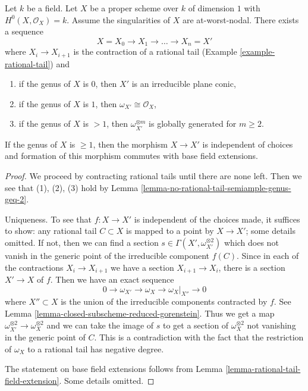 \begin{lemma}
\label{lemma-contracting-rational-tails}
Let $k$ be a field. Let $X$ be a proper scheme over $k$ of dimension $1$
with $H^0(X, \mathcal{O}_X) = k$. Assume the singularities of $X$ are
at-worst-nodal. There exists a sequence
$$
X = X_0 \to X_1 \to \ldots \to X_n = X'
$$
where $X_i \to X_{i + 1}$ is the contraction of a rational tail
(Example \ref{example-rational-tail}) and
\begin{enumerate}
\item if the genus of $X$ is $0$, then $X'$ is an irreducible
plane conic,
\item if the genus of $X$ is $1$, then $\omega_{X'} \cong \mathcal{O}_X$,
\item if the genus of $X$ is $> 1$, then
$\omega_{X'}^{\otimes m}$ is globally generated for $m \geq 2$.
\end{enumerate}
If the genus of $X$ is $\geq 1$, then the morphism $X \to X'$
is independent of choices and formation of this morphism
commutes with base field extensions.
\end{lemma}

\begin{proof}
We proceed by contracting rational tails until there are none
left. Then we see that (1), (2), (3) hold by
Lemma \ref{lemma-no-rational-tail-semiample-genus-geq-2}.

\medskip\noindent
Uniqueness. To see that $f : X \to X'$ is independent of the choices
made, it suffices to show: any rational tail $C \subset X$ is
mapped to a point by $X \to X'$; some details omitted.
If not, then we can find a section
$s \in \Gamma(X', \omega_{X'}^{\otimes 2})$ which does
not vanish in the generic point of the irreducible component $f(C)$.
Since in each of the contractions $X_i \to X_{i + 1}$
we have a section $X_{i + 1} \to X_i$, there is a section
$X' \to X$ of $f$. Then we have an exact sequence
$$
0 \to \omega_{X'} \to \omega_X \to \omega_X|_{X''} \to 0
$$
where $X'' \subset X$ is the union of the irreducible components
contracted by $f$. See Lemma \ref{lemma-closed-subscheme-reduced-gorenstein}.
Thus we get a map $\omega_{X'}^{\otimes 2} \to \omega_X^{\otimes 2}$
and we can take the image of $s$ to get a section of
$\omega_X^{\otimes 2}$ not vanishing in the generic point of $C$.
This is a contradiction with the fact that the restriction of
$\omega_X$ to a rational tail has negative degree.

\medskip\noindent
The statement on base field extensions follows from
Lemma \ref{lemma-rational-tail-field-extension}. Some details omitted.
\end{proof}

